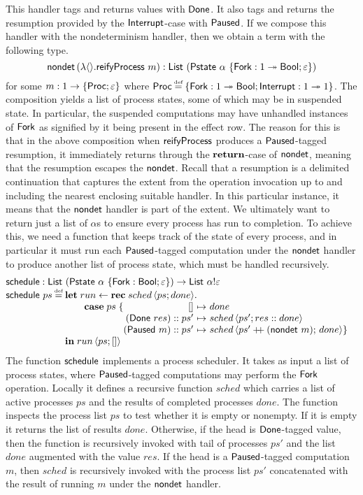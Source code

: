 \documentclass[12pt,phd,lfcs,twoside,openright,logo,leftchapter,normalheadings]{infthesis}
\theoremstyle{plain}
\theoremstyle{definition}
\begin{document}
%
This handler tags and returns values with $\mathsf{Done}$. It also tags and
returns the resumption provided by the $\mathsf{Interrupt}$-case with
$\mathsf{Paused}$. If we compose this handler with the nondeterminism
handler, then we obtain a term with the following type.
%
\[
  \mathsf{nondet}\,(\lambda\langle  \rangle.\mathsf{reifyProcess}~m) : \mathsf{List}~(\mathsf{Pstate}~\alpha~\{\mathsf{Fork}: 1 \twoheadrightarrow \mathsf{Bool};\varepsilon\})
\]
%
for some $m : 1 \to \{\mathsf{Proc};\varepsilon\}$ where
$\Proc \defas \{\Fork: \UnitType \opto \Bool;\Interrupt: \UnitType
\opto \UnitType\}$.
%
The composition yields a list of process states, some of which may be
in suspended state. In particular, the suspended computations may have
unhandled instances of $\mathsf{Fork}$ as signified by it being present in the
effect row. The reason for this is that in the above composition when
$\mathsf{reifyProcess}$ produces a $\mathsf{Paused}$-tagged resumption, it immediately
returns through the $\mathbf{return}$-case of $\mathsf{nondet}$, meaning that the
resumption escapes the $\mathsf{nondet}$. Recall that a resumption is a
delimited continuation that captures the extent from the operation
invocation up to and including the nearest enclosing suitable
handler. In this particular instance, it means that the $\mathsf{nondet}$
handler is part of the extent.
%
We ultimately want to return just a list of $\alpha$s to ensure every
process has run to completion. To achieve this, we need a function
that keeps track of the state of every process, and in particular it
must run each $\mathsf{Paused}$-tagged computation under the $\mathsf{nondet}$
handler to produce another list of process state, which must be
handled recursively.
%
\[
  \bl
    \schedule : \List~(\Pstate~\alpha~\{\Fork:\Bool;\varepsilon\}) \to \List~\alpha \eff \varepsilon\\
    \schedule~ps \defas
       \ba[t]{@{}l}
         \Let\;run \revto
             \Rec\;sched\,\Record{ps;done}.\\
              \qquad\Case\;ps\;\{
                  \ba[t]{@{}r@{~}c@{~}l}
                       \nil                  &\mapsto& done\\
                       (\Done~res) \cons ps' &\mapsto& sched\,\Record{ps';res \cons done}\\
                       (\Suspended~m) \cons ps' &\mapsto& sched\,\Record{ps' \concat (\nondet~m);\, done} \}
           \ea\\
           \In\;run\,\Record{ps;\nil}
       \ea
  \el
\]
%
The function $\mathsf{schedule}$ implements a process scheduler. It takes as
input a list of process states, where $\mathsf{Paused}$-tagged computations
may perform the $\mathsf{Fork}$ operation. Locally it defines a recursive
function $sched$ which carries a list of active processes $ps$ and the
results of completed processes $done$. The function inspects the
process list $ps$ to test whether it is empty or nonempty. If it is
empty it returns the list of results $done$. Otherwise, if the head is
$\mathsf{Done}$-tagged value, then the function is recursively invoked with
tail of processes $ps'$ and the list $done$ augmented with the value
$res$. If the head is a $\mathsf{Paused}$-tagged computation $m$, then
$sched$ is recursively invoked with the process list $ps'$
concatenated with the result of running $m$ under the $\mathsf{nondet}$
handler.
\end{document}
